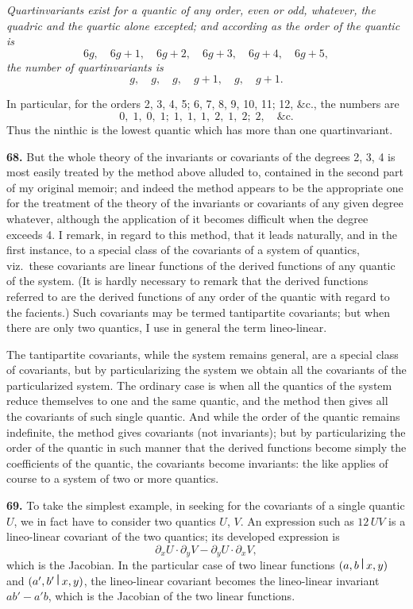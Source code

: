 \documentclass[11pt,a4paper]{book}
\begin{document}
\begin{center}
\textit{Quartinvariants exist for a quantic of any order, even or odd, whatever, the quadric and the quartic alone excepted; and according as the order of the quantic is}
\[6g,\quad 6g+1,\quad 6g+2,\quad 6g+3,\quad 6g+4,\quad 6g+5,\]
\textit{the number of quartinvariants is}
\[g,\quad g,\quad g,\quad g+1,\quad g,\quad g+1.\]

In particular, for the orders 2, 3, 4, 5; 6, 7, 8, 9, 10, 11; 12, \&c., the numbers are
\[0,\; 1,\; 0,\; 1;\; 1,\; 1,\; 1,\; 2,\; 1,\; 2;\; 2, \quad \&\text{c.}\]
Thus the ninthic is the lowest quantic which has more than one quartinvariant.

\medskip
\noindent\textbf{68.} But the whole theory of the invariants or covariants of the degrees 2, 3, 4 is most easily treated by the method above alluded to, contained in the second part of my original memoir; and indeed the method appears to be the appropriate one for the treatment of the theory of the invariants or covariants of any given degree whatever, although the application of it becomes difficult when the degree exceeds 4. I remark, in regard to this method, that it leads naturally, and in the first instance, to a special class of the covariants of a system of quantics, viz.\ these covariants are linear functions of the derived functions of any quantic of the system. (It is hardly necessary to remark that the derived functions referred to are the derived functions of any order of the quantic with regard to the facients.) Such covariants may be termed tantipartite covariants; but when there are only two quantics, I use in general the term lineo-linear.

The tantipartite covariants, while the system remains general, are a special class of covariants, but by particularizing the system we obtain all the covariants of the particularized system. The ordinary case is when all the quantics of the system reduce themselves to one and the same quantic, and the method then gives all the covariants of such single quantic. And while the order of the quantic remains indefinite, the method gives covariants (not invariants); but by particularizing the order of the quantic in such manner that the derived functions become simply the coefficients of the quantic, the covariants become invariants: the like applies of course to a system of two or more quantics.

\newpage

\medskip
\noindent\textbf{69.} To take the simplest example, in seeking for the covariants of a single quantic $U$, we in fact have to consider two quantics $U$, $V$. An expression such as $12\,UV$ is a lineo-linear covariant of the two quantics; its developed expression is
\[\partial_x U \cdot \partial_y V - \partial_y U \cdot \partial_x V,\]
which is the Jacobian. In the particular case of two linear functions $(a,b\,\raisebox{0.5ex}{\textbf{\textbar}}\,x,y)$ and $(a',b'\,\raisebox{0.5ex}{\textbf{\textbar}}\,x,y)$, the lineo-linear covariant becomes the lineo-linear invariant $ab'-a'b$, which is the Jacobian of the two linear functions.


\end{center}
\end{document}
